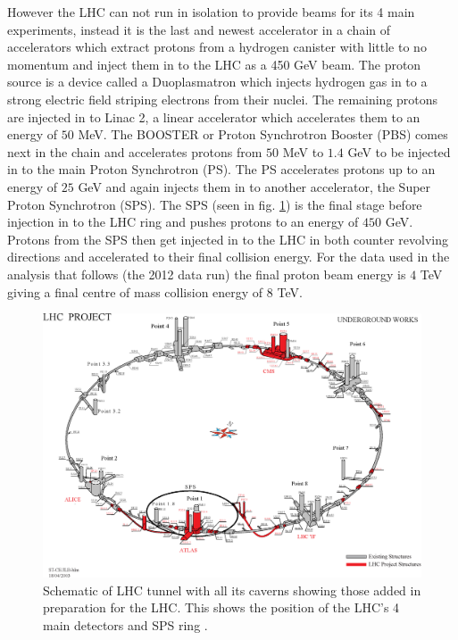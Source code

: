 	However the LHC can not run in isolation to provide beams for its 4 main experiments, instead it is the last and newest accelerator in a chain of accelerators which extract protons from a hydrogen canister with little to no momentum and inject them in to the LHC as a 450 GeV beam.
	The proton source is a device called a Duoplasmatron which injects hydrogen gas in to a strong electric field striping electrons from their nuclei. The remaining protons are injected in to Linac 2, a linear accelerator which accelerates them to an energy of $50$ MeV. The BOOSTER or Proton Synchrotron Booster (PBS) comes next in the chain and accelerates protons from $50$ MeV to $1.4$ GeV to be injected in to the main Proton Synchrotron (PS). The PS accelerates protons up to an energy of $25$ GeV and again injects them in to another accelerator, the Super Proton Synchrotron (SPS). The SPS (seen in fig. \ref{fig:experimentLHC}) is the final stage before injection in to the LHC ring and pushes protons to an energy of $450$ GeV. Protons from the SPS then get injected in to the LHC in both counter revolving directions and accelerated to their final collision energy. For the data used in the analysis that follows (the 2012 data run) the final proton beam energy is $4$ TeV giving a final centre of mass collision energy of $8$ TeV.

	\begin{figure}[h]
        \begin{center}
            \includegraphics[scale=0.6]{images/LHCUnder.eps}
        \end{center}
        \caption{Schematic of LHC tunnel with all its caverns showing those added in preparation for the LHC. This shows the position of the LHC's 4 main detectors and SPS ring \cite{1367-2630-9-9-335}.}
        \label{fig:experimentLHC}
    \end{figure}

